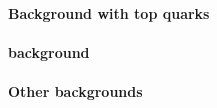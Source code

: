 {{%




\paragraph{Background with top quarks}








\paragraph{\Ztautau background}




\paragraph{Other backgrounds}


}}
